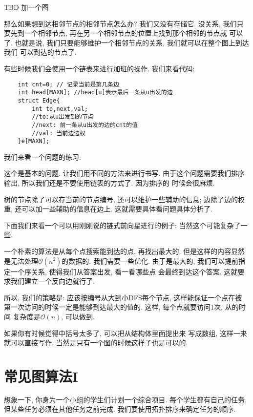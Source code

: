 TBD 加一个图

那么如果想到达相邻节点的相邻节点怎么办? 我们又没有存储它.
没关系, 我们只要先到一个相邻节点, 再在另一个相邻节点的位置上找到那个相邻的节点就
可以了. 也就是说, 我们只要能够维护一个相邻节点的关系, 我们就可以在整个图上到达我们
可以到达的节点了. 

 有些时候我们会使用一个链表来进行加班的操作. 
我们来看代码: 

\begin{lstlisting}
    int cnt=0; // 记录当前是第几条边
    int head[MAXN]; //head[u]表示最后一条从u出发的边
    struct Edge{
        int to,next,val;
        //to:从u出发到的节点
	    //next: 前一条从u出发的边的cnt的值
	    //val: 当前边边权
    }e[MAXN];
\end{lstlisting}

我们来看一个问题的练习: 

 这个是基本的问题. 让我们用不同的方法来进行书写. 
由于这个问题需要我们排序输出, 所以我们还是不要使用链表的方式了. 因为排序的
时候会很麻烦. 

树的节点除了可以存当前的节点编号, 还可以维护一些辅助的信息; 边除了边的权重, 
还可以加一些辅助的信息在边上. 这就需要具体看问题具体分析了. 

下面我们来看一个可以用刚刚说的链式前向星进行的例子: 当然这个可能复杂了一些. 

 一个朴素的算法是从每个点搜索能到达的点, 再找出最大的.
但是这样的内容显然是无法处理$\mathcal O(n^2)$的数据的. 我们需要一些优化. 
由于是最大的, 我们可以提前指定一个序关系, 使得我们从答案出发, 看一看哪些点
会最终到达这个答案. 这就要求我们建立一个反向边就行了. 

所以, 我们的策略是: 应该按编号从大到小DFS每个节点, 这样能保证一个点在被
第一次访问的时候一定是能够到达最大的值的. 这样, 每个点就要访问1次, 从的时间
复杂度是$\mathcal O(n)$, 可以做到. 

如果你有时候觉得中括号太多了, 可以把从结构体里面提出来
写成数组, 这样一来就可以直接写作. 
当然是只有一个图的时候这样子也是可以的. 

\section{常见图算法I}

 想象一下, 你身为一个小组的学生们计划一个综合项目. 
每个学生都有自己的任务, 但某些任务必须在其他任务之前完成. 
我们要使用拓扑排序来确定任务的顺序. 

